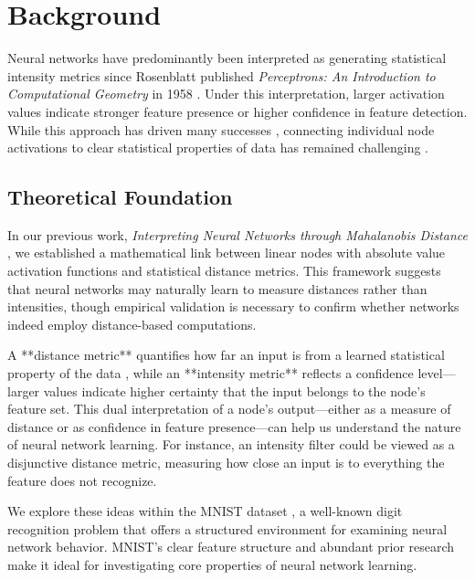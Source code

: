 \section{Background}

Neural networks have predominantly been interpreted as generating statistical intensity metrics since Rosenblatt published \textit{Perceptrons: An Introduction to Computational Geometry} in 1958 \citep{rosenblatt1958perceptron}. Under this interpretation, larger activation values indicate stronger feature presence or higher confidence in feature detection. While this approach has driven many successes \citep{krizhevsky2012imagenet, lecun2015deep}, connecting individual node activations to clear statistical properties of data has remained challenging \citep{olah2017feature, zeiler2014visualizing}.

\subsection{Theoretical Foundation}

In our previous work, \textit{Interpreting Neural Networks through Mahalanobis Distance} \citep{oursland2024interpreting}, we established a mathematical link between linear nodes with absolute value activation functions and statistical distance metrics. This framework suggests that neural networks may naturally learn to measure distances rather than intensities, though empirical validation is necessary to confirm whether networks indeed employ distance-based computations.

A **distance metric** quantifies how far an input is from a learned statistical property of the data \citep{deza2009encyclopedia}, while an **intensity metric** reflects a confidence level—larger values indicate higher certainty that the input belongs to the node's feature set. This dual interpretation of a node's output—either as a measure of distance or as confidence in feature presence—can help us understand the nature of neural network learning. For instance, an intensity filter could be viewed as a disjunctive distance metric, measuring how close an input is to everything the feature does not recognize.

We explore these ideas within the MNIST dataset \citep{lecun1998gradient}, a well-known digit recognition problem that offers a structured environment for examining neural network behavior. MNIST's clear feature structure and abundant prior research make it ideal for investigating core properties of neural network learning.

